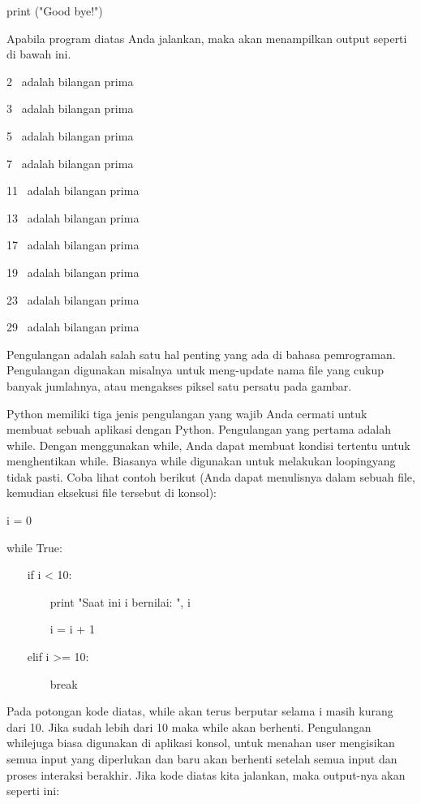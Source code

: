print ("Good bye!") \par
\vspace{12pt}
\vspace{\baselineskip}
Apabila program diatas Anda jalankan, maka akan menampilkan output seperti di bawah ini.\vspace{\baselineskip}
\vspace{\baselineskip}
 \par
2~ adalah bilangan prima \par
3~ adalah bilangan prima \par
5~ adalah bilangan prima \par
7~ adalah bilangan prima \par
11~ adalah bilangan prima \par
13~ adalah bilangan prima \par
17~ adalah bilangan prima \par
19~ adalah bilangan prima \par
23~ adalah bilangan prima \par
29~ adalah bilangan prima \par
\vspace{12pt}
Pengulangan adalah salah satu hal penting yang ada di bahasa pemrograman. Pengulangan digunakan misalnya untuk meng-update $  $nama $  $file $  $yang cukup banyak jumlahnya, atau mengakses piksel satu persatu pada gambar. \par
Python memiliki tiga jenis pengulangan yang wajib Anda cermati untuk membuat sebuah aplikasi dengan Python. Pengulangan yang pertama adalah $  $while. Dengan menggunakan $  $while, Anda dapat membuat kondisi tertentu untuk menghentikan $  $while. Biasanya $  $while $  $digunakan untuk melakukan $  $loopingyang tidak pasti. Coba lihat contoh berikut (Anda dapat menulisnya dalam sebuah $  $file, kemudian eksekusi $  $file $  $tersebut di konsol): \par
i = 0 \par
while True: \par
~~~ if i < 10: \par
~~~~~~~ print "Saat ini i bernilai: ", i \par
~~~~~~~ i = i + 1 \par
~~~ elif i >= 10: \par
~~~~~~~ break \par
\vspace{12pt}
Pada potongan kode diatas, $  $while $  $akan terus berputar selama i masih kurang dari 10. Jika sudah lebih dari 10 maka $  $while $  $akan berhenti. Pengulangan $  $whilejuga biasa digunakan di aplikasi konsol, untuk menahan $  $user $  $mengisikan semua input yang diperlukan dan baru akan berhenti setelah semua input dan proses interaksi berakhir. Jika kode diatas kita jalankan, maka $  $output-nya akan seperti ini: \par
